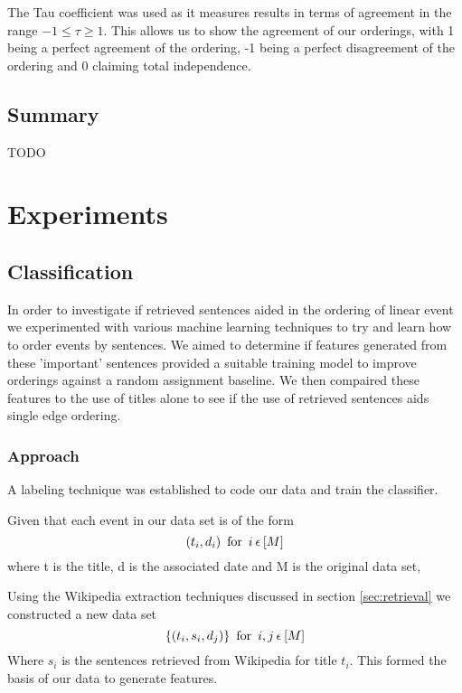 \documentclass[bsc,frontabs,twoside,singlespacing,parskip,deptreport]{infthesis}     %
\begin{document}
The Tau coefficient was used as it measures results in terms of agreement in the range $-1 \leq \tau \geq 1$.
This allows us to show the agreement of our orderings, with 1 being a perfect agreement of the ordering, -1 being a perfect disagreement of the ordering and 0 claiming
total independence.


\section{Summary}
TODO

\chapter{Experiments}
\section{Classification}
In order to investigate if retrieved sentences aided in the  ordering of linear event we experimented with various
machine learning techniques to try and learn how to order events by sentences.
We aimed to determine if features generated from these 'important' sentences provided a suitable training model
to improve orderings against a random assignment baseline. We then compaired these features to the use of titles alone
to see if the use of retrieved sentences aids single edge ordering.


\subsection{Approach}
A labeling technique was established to code our data and train the classifier.


 Given that each event in our data set is of the form
  \begin{equation}
  (t_{i},d_{i}) \hspace{0.5em} \text{for} \hspace{0.5em} i \hspace{0.2em}\epsilon \hspace{0.2em} [M]\nonumber
    \end{equation}
    where t is the title, d is the associated date and M is the original data set,

    Using the Wikipedia extraction techniques discussed in section \ref{sec:retrieval} we constructed a new data set
    \begin{equation}
      \{(t_{i},s_{i},d_{j})\} \hspace{0.5em} \text{for} \hspace{0.5em}i,j  \hspace{0.2em}\epsilon \hspace{0.2em}[M]\nonumber
    \end{equation}
    Where $s_i$ is the sentences retrieved from Wikipedia for title $t_i$. 
    This formed the basis of our data to generate features.
\end{document}
